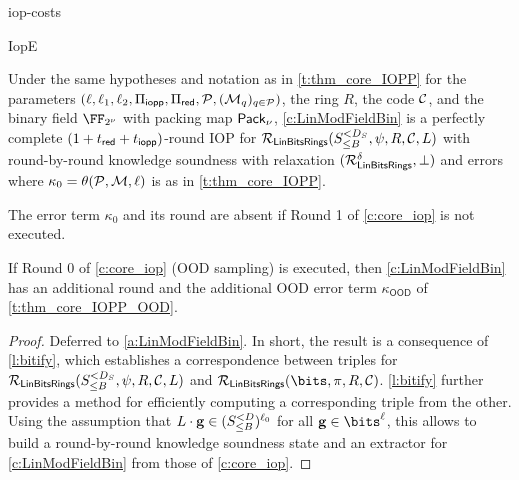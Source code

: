 \begin{lncsappendix}{iop-costs}
\begin{lncsmove}{IopE}
\begin{theorem}\label{t:thm_LinModFieldBits}
    Under the same hypotheses and notation as in \cref{t:thm_core_IOPP} for the parameters $(\ell,\ell_1,\ell_2, \Pi_{\mathsf{iopp}},\Pi_{\mathsf{red}}, \mathcal{P}, (\mathcal{M}_q)_{q\in \mathcal{P}})$, the  ring $R$, the code $\mathcal{C}$, and the binary field $\comfield$ with packing map $\mathsf{Pack}_\nu$, \cref{c:LinModFieldBin} is a perfectly complete $(1+t_{\mathsf{red}} + t_{\mathsf{iopp}})$-round IOP for $\mathcal{R}_{\mathsf{LinBitsRings}}({S_{\leq B}^{<D_S}},\psi, R, \mathcal{C},L)$ with round-by-round knowledge soundness with relaxation $(\mathcal{R}_{\mathsf{LinBitsRings}}^{\delta},\bot)$ and errors  where $
    \kappa_0 = \theta(\cP,\cM,\codedim) %
    $ is as in \cref{t:thm_core_IOPP}. %
    
    The error term $\kappa_0$ and its round are absent if Round 1 of \cref{c:core_iop} is not executed. 
    
    If Round 0 of \cref{c:core_iop} (OOD sampling) is executed, then \cref{c:LinModFieldBin} has an additional round and the additional OOD error term $\kappa_{\mathsf{OOD}}$ of \cref{t:thm_core_IOPP_OOD}.
\end{theorem}
\begin{proof} Deferred to \cref{a:LinModFieldBin}. In short, the result is a consequence of \cref{l:bitify}, which establishes a correspondence between  triples for $\mathcal{R}_{\mathsf{LinBitsRings}}({S_{\leq B}^{<D_S}},\psi, R, \mathcal{C},{}L)$ and $\LinBitsDual\lncsbreak(\bits,\lncsbreak\pi,\lncsbreak \moduletwo,\lncsbreak\cC)$. \cref{l:bitify} further provides a method for efficiently computing a corresponding triple  from the other. Using the assumption that $L\cdot \mathbf{g} \in (S_{\leq B}^{<D})^{\ell_0}$ for all $\bfg\in \bits^{\codedim}$, this allows  to build a round-by-round knowledge soundness state and an extractor for \cref{c:LinModFieldBin} from those of \cref{c:core_iop}.
\end{proof}
\end{lncsmove}



\end{lncsappendix}
